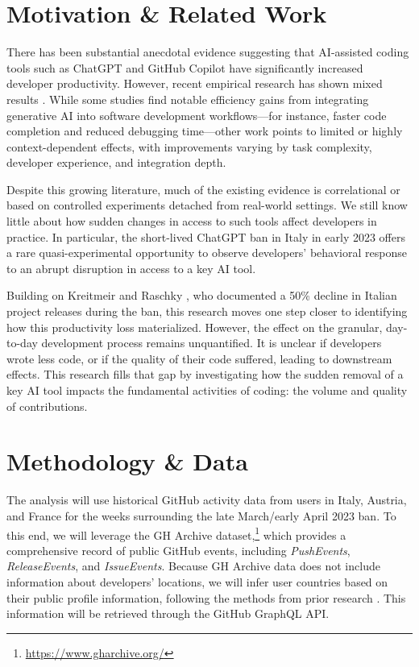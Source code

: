 \section*{Motivation \& Related Work}

There has been substantial anecdotal evidence suggesting that AI-assisted coding tools such as ChatGPT and GitHub Copilot have significantly increased developer productivity. However, recent empirical research has shown mixed results \cite{cui2025the, paradis2024doesaiimpactdevelopment, peng2023impactaideveloperproductivity}. While some studies find notable efficiency gains from integrating generative AI into software development workflows—for instance, faster code completion and reduced debugging time—other work points to limited or highly context-dependent effects, with improvements varying by task complexity, developer experience, and integration depth.

Despite this growing literature, much of the existing evidence is correlational or based on controlled experiments detached from real-world settings. We still know little about how sudden changes in access to such tools affect developers in practice. In particular, the short-lived ChatGPT ban in Italy in early 2023 offers a rare quasi-experimental opportunity to observe developers’ behavioral response to an abrupt disruption in access to a key AI tool.

Building on Kreitmeir and Raschky \cite{Kreitmeir2023}, who documented a 50\% decline in Italian project releases during the ban, this research moves one step closer to identifying how this productivity loss materialized. However, the effect on the granular, day-to-day development process remains unquantified. It is unclear if developers wrote less code, or if the quality of their code suffered, leading to downstream effects. This research fills that gap by investigating how the sudden removal of a key AI tool impacts the fundamental activities of coding: the volume and quality of contributions.


\section*{Methodology \& Data}

The analysis will use historical GitHub activity data from users in Italy, Austria, and France for the weeks surrounding the late March/early April 2023 ban. To this end, we will leverage the GH Archive dataset,\footnote{\url{https://www.gharchive.org/}} which provides a comprehensive record of public GitHub events, including \textit{PushEvents}, \textit{ReleaseEvents}, and \textit{IssueEvents}. Because GH Archive data does not include information about developers’ locations, we will infer user countries based on their public profile information, following the methods from prior research \cite{Kreitmeir2023}. This information will be retrieved through the GitHub GraphQL API.

